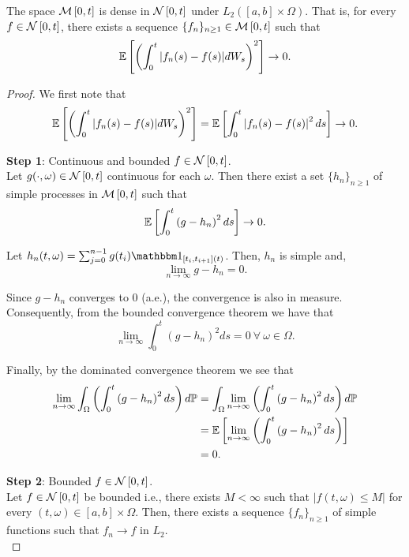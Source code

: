 \documentclass[../TGMAFFIRO.tex]{subfiles}
\begin{document}
\begin{proposition}\label{prop:l2_convergence_ito_integral}
	The space $\mathcal{M}\left[0, t\right]$ is dense in $\mathcal{N}\left[0, t\right]$ under $L_2([a,b]\times\Omega)$. That is, for every $f\in\mathcal{N}\left[0, t\right]$, there exists a sequence $\{f_n\}_{n\geq 1} \in \mathcal{M}\left[0, t\right]$ such that
	\begin{equation}
		\mathbb{E}\left[\left(\int_0^t |f_n(s) - f(s)|dW_s\right)^2\right] \to 0.
	\end{equation}
	
\begin{proof}
We first note that 
\begin{equation}
	\mathbb{E}\left[\left(\int_0^t |f_n(s) - f(s)|dW_s\right)^2\right] = \mathbb{E}\left[\int_0^t\left|f_n(s) - f(s) \right|^2 ds\right] \to 0.
\end{equation}

\textbf{Step 1}: Continuous and bounded $f\in\mathcal{N}\left[0, t\right]$.\\
Let $g(\cdot, \omega)\in \mathcal{N}\left[0, t\right]$ continuous for each $\omega$. Then there exist a set $\{h_n\}_{n\geq 1}$ of simple processes in $\mathcal{M}\left[0, t\right]$ such that 
	\begin{equation}
		\mathbb{E}\left[\int_0^t\left(g - h_n\right)^2 ds\right]	\to 0.
	\end{equation}

Let $h_n(t, \omega) = \sum_{j=0}^{n-1}g(t_i)	\ind_{[t_i, t_{i+1}](t)}$. Then, $h_n$ is simple and,
\begin{equation}
  \lim_{n\to\infty} g - h_n = 0.
\end{equation}

Since $g - h_n$ converges to 0 (a.e.), the convergence is also in measure. Consequently, from the bounded convergence theorem we have that
\begin{equation}
  \lim_{n\to\infty} \int_0^t\left(g - h_n\right)^2 ds = 0 \ \forall \ \omega \in \Omega.
\end{equation}

Finally, by the dominated convergence theorem we see that
\begin{align*}
  \lim_{n\to\infty} \int_\Omega\left(\int_0^t\left(g - h_n\right)^2 ds\right)d\mathbb{P} &=  \int_\Omega \lim_{n\to\infty} \left(\int_0^t\left(g - h_n\right)^2 ds\right)d\mathbb{P} \\
  &= \mathbb{E}\left[\lim_{n\to\infty}\left(\int_0^t\left(g - h_n\right)^2 ds\right)\right] \\
  &= 0.
\end{align*}

\textbf{Step 2}: Bounded $f\in\mathcal{N}\left[0, t\right]$.\\
Let $f\in\mathcal{N}\left[0, t\right]$ be bounded i.e., there exists $M<\infty$ such that $|f(t, \omega) \leq M|$ for every $(t,\omega) \in [a,b]\times\Omega$. Then, there exists a sequence $\{f_n\}_{n\geq 1}$ of simple functions such that $f_n \to f$ in $L_2$.\\


\end{proof}
\end{proposition}
\end{document}
